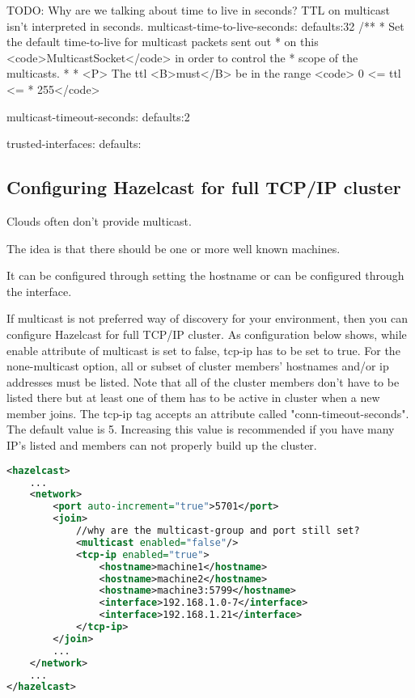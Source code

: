 TODO: Why are we talking about time to live in seconds? TTL on multicast isn't interpreted in seconds.
multicast-time-to-live-seconds:
defaults:32
/**
   * Set the default time-to-live for multicast packets sent out
   * on this <code>MulticastSocket</code> in order to control the 
   * scope of the multicasts.
   *
   * <P> The ttl <B>must</B> be in the range <code> 0 <= ttl <=
   * 255</code>


multicast-timeout-seconds:
defaults:2

trusted-interfaces:
defaults:


\subsection{Configuring Hazelcast for full TCP/IP cluster}

Clouds often don't provide multicast.

The idea is that there should be one or more well known machines.

It can be configured through setting the hostname or can be configured through the interface. 

If multicast is not preferred way of discovery for your environment, then you can configure Hazelcast for full TCP/IP cluster. As configuration below shows, while enable attribute of multicast is set to false, tcp-ip has to be set to true. For the none-multicast option, all or subset of cluster members' hostnames and/or ip addresses must be listed. Note that all of the cluster members don't have to be listed there but at least one of them has to be active in cluster when a new member joins. The tcp-ip tag accepts an attribute called "conn-timeout-seconds". The default value is 5. Increasing this value is recommended if you have many IP's listed and members can not properly build up the cluster.

\begin{lstlisting}[language=xml]
<hazelcast>
    ...
    <network>
        <port auto-increment="true">5701</port>
        <join>
            //why are the multicast-group and port still set?
            <multicast enabled="false"/>
            <tcp-ip enabled="true">
                <hostname>machine1</hostname>
                <hostname>machine2</hostname>
                <hostname>machine3:5799</hostname>
                <interface>192.168.1.0-7</interface>     
                <interface>192.168.1.21</interface> 
            </tcp-ip>
        </join>
        ...
    </network>
    ...
</hazelcast>
\end{lstlisting}

